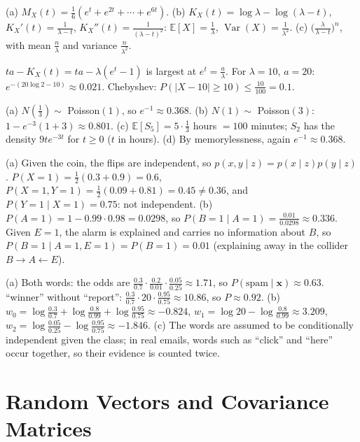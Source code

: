 \documentclass[11pt]{article}
\newcommand{\E}{\mathbb{E}}
\DeclareMathOperator{\Var}{Var}
\begin{document}
\begin{description}[leftmargin=0pt, itemsep=0.3em]
    \item[\ref{pr:mgf-practice}.] (a) $M_X(t) = \frac{1}{6}(e^t + e^{2t} + \cdots + e^{6t})$. (b) $K_X(t) = \log\lambda - \log(\lambda - t)$, $K_X'(t) = \frac{1}{\lambda - t}$, $K_X''(t) = \frac{1}{(\lambda - t)^2}$: $\E[X] = \frac{1}{\lambda}$, $\Var(X) = \frac{1}{\lambda^2}$. (c) $\big(\frac{\lambda}{\lambda - t}\big)^n$, with mean $\frac{n}{\lambda}$ and variance $\frac{n}{\lambda^2}$.
    \item[\ref{pr:poisson-chernoff}.] $ta - K_X(t) = ta - \lambda(e^t - 1)$ is largest at $e^t = \frac{a}{\lambda}$. For $\lambda = 10$, $a = 20$: $e^{-(20\log 2 - 10)} \approx 0.021$. Chebyshev: $P(|X - 10| \geq 10) \leq \frac{10}{100} = 0.1$.
    \item[\ref{pr:poisson-process}.] (a) $N(\frac{1}{3}) \sim$ Poisson$(1)$, so $e^{-1} \approx 0.368$. (b) $N(1) \sim$ Poisson$(3)$: $1 - e^{-3}(1 + 3) \approx 0.801$. (c) $\E[S_5] = 5 \cdot \frac{1}{3}$ hours $= 100$ minutes; $S_2$ has the density $9te^{-3t}$ for $t \geq 0$ ($t$ in hours). (d) By memorylessness, again $e^{-1} \approx 0.368$.
\item[\ref{pr:cond-indep}.] (a) Given the coin, the flips are independent, so $p(x, y \mid z) = p(x \mid z)p(y \mid z)$. $P(X = 1) = \frac{1}{2}(0.3 + 0.9) = 0.6$, $P(X = 1, Y = 1) = \frac{1}{2}(0.09 + 0.81) = 0.45 \neq 0.36$, and $P(Y = 1 \mid X = 1) = 0.75$: not independent. (b) $P(A = 1) = 1 - 0.99 \cdot 0.98 = 0.0298$, so $P(B = 1 \mid A = 1) = \frac{0.01}{0.0298} \approx 0.336$. Given $E = 1$, the alarm is explained and carries no information about $B$, so $P(B = 1 \mid A = 1, E = 1) = P(B = 1) = 0.01$ (explaining away in the collider $B \to A \leftarrow E$).
\item[\ref{pr:naive-bayes}.] (a) Both words: the odds are $\frac{0.3}{0.7} \cdot \frac{0.2}{0.01} \cdot \frac{0.05}{0.25} \approx 1.71$, so $P(\text{spam} \mid \mathbf{x}) \approx 0.63$. ``winner'' without ``report'': $\frac{0.3}{0.7} \cdot 20 \cdot \frac{0.95}{0.75} \approx 10.86$, so $P \approx 0.92$. (b) $w_0 = \log\frac{0.3}{0.7} + \log\frac{0.8}{0.99} + \log\frac{0.95}{0.75} \approx -0.824$, $w_1 = \log 20 - \log\frac{0.8}{0.99} \approx 3.209$, $w_2 = \log\frac{0.05}{0.25} - \log\frac{0.95}{0.75} \approx -1.846$. (c) The words are assumed to be conditionally independent given the class; in real emails, words such as ``click'' and ``here'' occur together, so their evidence is counted twice.
\end{description}

\section*{Random Vectors and Covariance Matrices}
\end{document}
